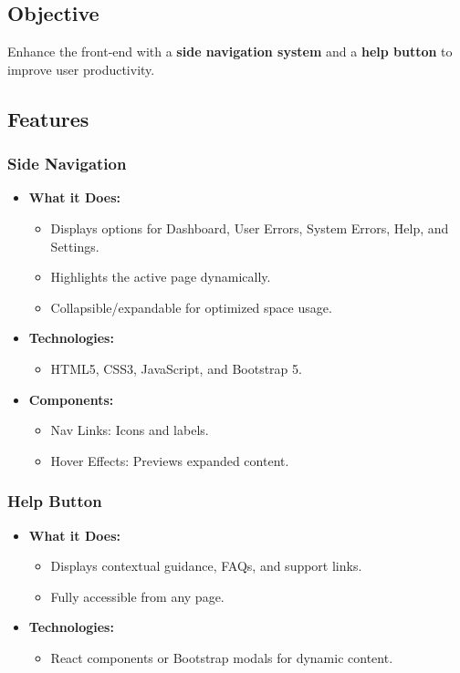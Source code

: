 \documentclass[12pt]{article}
\begin{document}
\subsection*{Objective}
Enhance the front-end with a \textbf{side navigation system} and a \textbf{help button} to improve user productivity.

\subsection*{Features}

\subsubsection*{Side Navigation}
\begin{itemize}
    \item \textbf{What it Does:}
    \begin{itemize}
        \item Displays options for Dashboard, User Errors, System Errors, Help, and Settings.
        \item Highlights the active page dynamically.
        \item Collapsible/expandable for optimized space usage.
    \end{itemize}
    \item \textbf{Technologies:}
    \begin{itemize}
        \item HTML5, CSS3, JavaScript, and Bootstrap 5.
    \end{itemize}
    \item \textbf{Components:}
    \begin{itemize}
        \item Nav Links: Icons and labels.
        \item Hover Effects: Previews expanded content.
    \end{itemize}
\end{itemize}

\subsubsection*{Help Button}
\begin{itemize}
    \item \textbf{What it Does:}
    \begin{itemize}
        \item Displays contextual guidance, FAQs, and support links.
        \item Fully accessible from any page.
    \end{itemize}
    \item \textbf{Technologies:}
    \begin{itemize}
        \item React components or Bootstrap modals for dynamic content.
    \end{itemize}
\end{itemize}
\end{document}
